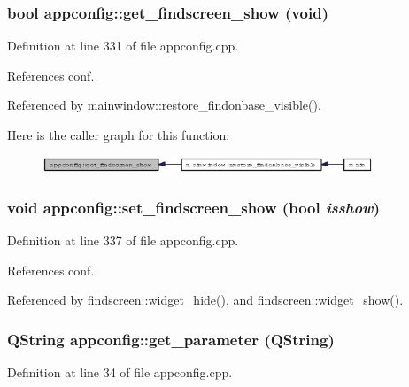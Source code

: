 \subsubsection{\setlength{\rightskip}{0pt plus 5cm}bool appconfig::get\_\-findscreen\_\-show (void)}\label{classappconfig_056484ddd724fd4f30887a5087658d52}




Definition at line 331 of file appconfig.cpp.

References conf.

Referenced by mainwindow::restore\_\-findonbase\_\-visible().

Here is the caller graph for this function:\begin{figure}[H]
\begin{center}
\leavevmode
\includegraphics[width=280pt]{classappconfig_056484ddd724fd4f30887a5087658d52_icgraph}
\end{center}
\end{figure}
\subsubsection{\setlength{\rightskip}{0pt plus 5cm}void appconfig::set\_\-findscreen\_\-show (bool {\em isshow})}\label{classappconfig_45b5ebfaea239d18dcaab5ba29293e6a}




Definition at line 337 of file appconfig.cpp.

References conf.

Referenced by findscreen::widget\_\-hide(), and findscreen::widget\_\-show().
\subsubsection{\setlength{\rightskip}{0pt plus 5cm}QString appconfig::get\_\-parameter (QString)\hspace{0.3cm}{\tt  [private]}}\label{classappconfig_d2db70d1978d1ca2bc0091a712ba641f}




Definition at line 34 of file appconfig.cpp.

